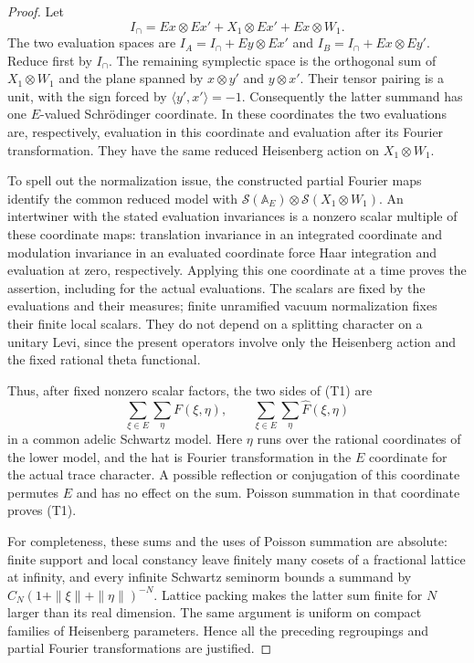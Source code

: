 \begin{proof}
Let
\[
 I_\cap=Ex\otimes Ex'+X_1\otimes Ex'+Ex\otimes W_1.
\]
The two evaluation spaces are
\(I_A=I_\cap+Ey\otimes Ex'\) and
\(I_B=I_\cap+Ex\otimes Ey'\).
Reduce first by \(I_\cap\). The remaining symplectic space is the
orthogonal sum of \(X_1\otimes W_1\) and the plane spanned by
\(x\otimes y'\) and \(y\otimes x'\). Their tensor pairing is a unit,
with the sign forced by
\(\langle y',x'\rangle=-1\).
Consequently the latter summand has one \(E\)-valued Schr\"odinger
coordinate. In these coordinates the two evaluations are, respectively,
evaluation in this coordinate and evaluation after its Fourier
transformation. They have the same reduced Heisenberg action on
\(X_1\otimes W_1\).

To spell out the normalization issue, the constructed partial Fourier
maps identify the common reduced model with
\(\mathcal S(\mathbb A_E)\otimes
 \mathcal S(X_1\otimes W_1)\).
An intertwiner with the stated evaluation invariances is a nonzero
scalar multiple of these coordinate maps: translation invariance in an
integrated coordinate and modulation invariance in an evaluated
coordinate force Haar integration and evaluation at zero, respectively.
Applying this one coordinate at a time proves the assertion, including
for the actual evaluations. The scalars are fixed by the evaluations
and their measures; finite unramified vacuum normalization fixes their
finite local scalars. They do not depend on a splitting character on a
unitary Levi, since the present operators involve only the Heisenberg
action and the fixed rational theta functional.

Thus, after fixed nonzero scalar factors, the two sides of (T1) are
\[
 \sum_{\xi\in E}\sum_{\eta}
        F(\xi,\eta),\qquad
 \sum_{\xi\in E}\sum_{\eta}
        \widehat F(\xi,\eta)
\]
in a common adelic Schwartz model. Here \(\eta\) runs over the rational
coordinates of the lower model, and the hat is Fourier transformation
in the \(E\) coordinate for the actual trace character. A possible
reflection or conjugation of this coordinate permutes \(E\) and has
no effect on the sum. Poisson summation in that coordinate proves (T1).

For completeness, these sums and the uses of Poisson summation are
absolute: finite support and local constancy leave finitely many
cosets of a fractional lattice at infinity, and every infinite
Schwartz seminorm bounds a summand by
\(C_N(1+\|\xi\|+\|\eta\|)^{-N}\).
Lattice packing makes the latter sum finite for \(N\) larger than its
real dimension. The same argument is uniform on compact families of
Heisenberg parameters. Hence all the preceding regroupings and partial
Fourier transformations are justified.
\end{proof}

